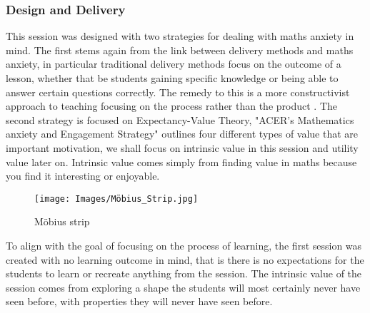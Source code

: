 \documentclass[11pt, a4paper, notitlepage]{article}
\begin{document}
\subsubsection{Design and Delivery}
This session was designed with two strategies for dealing with maths anxiety in mind. The first stems again from the link between delivery methods and maths anxiety, in particular traditional delivery methods focus on the outcome of a lesson, whether that be students gaining specific knowledge or being able to answer certain questions correctly. The remedy to this is a more constructivist approach to teaching focusing on the process rather than the product \cite{Finlayson:2014}. The second strategy is focused on Expectancy-Value Theory, "ACER's Mathematics anxiety and Engagement Strategy" \cite{MAES:2024} outlines four different types of value that are important motivation, we shall focus on intrinsic value in this session and utility value later on. Intrinsic value comes simply from finding value in maths because you find it interesting or enjoyable.

\begin{wrapfigure}{r}{0.3\textwidth}
\texttt{[image: Images/Möbius\_Strip.jpg]}
\caption{M\"obius strip}
\end{wrapfigure}
\par

To align with the goal of focusing on the process of learning, the first session was created with no learning outcome in mind, that is there is no expectations for the students to learn or recreate anything from the session. The intrinsic value of the session comes from exploring a shape the students will most certainly never have seen before, with properties they will never have seen before. 

\vspace{1em}
\end{document}
